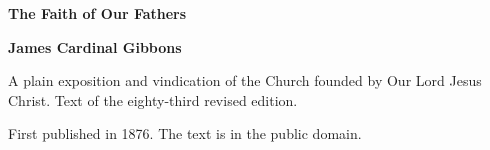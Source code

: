 \documentclass[11pt,letterpaper]{article}
\begin{document}
\color{ink}

\begin{titlepage}
\centering
\vspace*{4em}
{\LARGE\bfseries\color{heading} The Faith of Our Fathers\par}
\vspace{2em}
{\Large\bfseries\color{heading} James Cardinal Gibbons\par}
\vspace{2.5em}
{\itshape\color{subhead}\parbox{0.8\linewidth}{\centering A plain exposition and vindication of the Church founded by Our Lord Jesus Christ. Text of the eighty-third revised edition.\par}}
\vfill
{\small First published in 1876. The text is in the public domain.\par}
\vspace{2em}
\end{titlepage}

\tableofcontents


\end{document}
